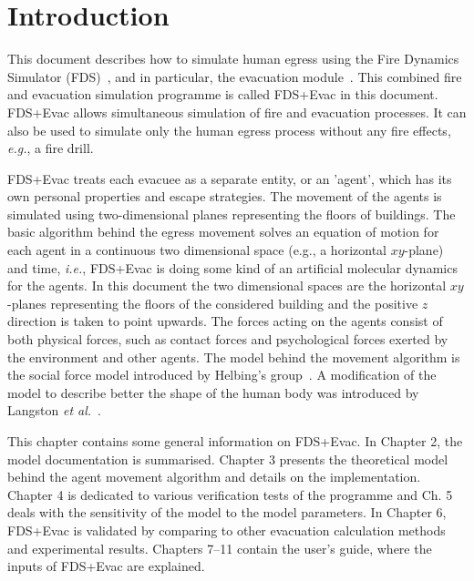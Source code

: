 \documentclass[12pt,a4paper,final,twoside]{stylevk}
\begin{document}
\clearpage

\newpage


\tableofcontents

\newpage

\chapter{Introduction}\label{Sec_Intro}

\noindent This document describes how to simulate human egress using
the Fire Dynamics Simulator (FDS)~\cite{FDS_Manual, FDS_UserGuide,
  FDS_VVGuide1, FDS_VVGuide2}, and in particular, the evacuation
module~\cite{Korhonen05, Korhonen07a, Korhonen07b, Korhonen08a,
  Korhonen08b}.  This combined fire and evacuation simulation
programme is called FDS+Evac in this document.  FDS+Evac allows
simultaneous simulation of fire and evacuation processes.  It can also
be used to simulate only the human egress process without any fire
effects, \emph{e.g.}, a fire drill.


FDS+Evac treats each evacuee as a separate entity, or an 'agent',
which has its own personal properties and escape strategies.  The
movement of the agents is simulated using two-dimensional planes
representing the floors of buildings.  The basic algorithm behind the
egress movement solves an equation of motion for each agent in a
continuous two dimensional space (e.g., a horizontal $xy$-plane) and
time, \emph{i.e.}, FDS+Evac is doing some kind of an artificial
molecular dynamics for the agents.  In this document the two
dimensional spaces are the horizontal $xy$-planes representing the
floors of the considered building and the positive $z$ direction is
taken to point upwards.  The forces acting on the agents consist of
both physical forces, such as contact forces and psychological forces
exerted by the environment and other agents.  The model behind the
movement algorithm is the social force model introduced by Helbing's
group~\cite{Helbing95, Helbing00, Helbing02, Werner03}.  A
modification of the model to describe better the shape of the human
body was introduced by Langston \emph{et al.}~\cite{Langston06}.


This chapter contains some general information on FDS+Evac.  In
Chapter 2, the model documentation is summarised.  Chapter 3 presents
the theoretical model behind the agent movement algorithm and details
on the implementation.  Chapter 4 is dedicated to various verification
tests of the programme and Ch. 5 deals with the sensitivity of the
model to the model parameters.  In Chapter 6, FDS+Evac is validated by
comparing to other evacuation calculation methods and experimental
results.  Chapters 7--11 contain the user's guide, where the inputs of
FDS+Evac are explained.
\end{document}
